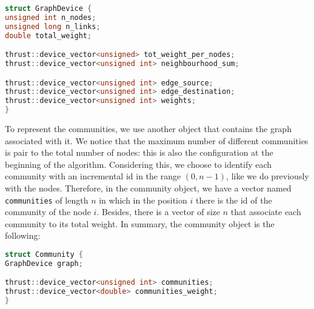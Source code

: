 \begin{lstlisting}[language=C++]
struct GraphDevice {
unsigned int n_nodes;
unsigned long n_links;
double total_weight;

thrust::device_vector<unsigned> tot_weight_per_nodes;
thrust::device_vector<unsigned int> neighbourhood_sum;

thrust::device_vector<unsigned int> edge_source;
thrust::device_vector<unsigned int> edge_destination;
thrust::device_vector<unsigned int> weights;
}
\end{lstlisting}
To represent the communities, we use another object that contains the graph associated with it. We notice that the maximum number of different communities is pair to the total number of nodes: this is also the configuration at the beginning of the algorithm.  Considering this, we choose to identify each community with an incremental id in the range $(0, n-1)$, like we do previously with the nodes. Therefore, in the community object, we have a vector named \verb|communities| of length $n$ in which in the position $i$ there is the id of the community of the node $i$. Besides, there is a vector of size $n$ that associate each community to its total weight.  In summary,  the community object is the following:\\
\begin{lstlisting}[language=C++]
struct Community {
GraphDevice graph;

thrust::device_vector<unsigned int> communities;
thrust::device_vector<double> communities_weight;
}
\end{lstlisting}